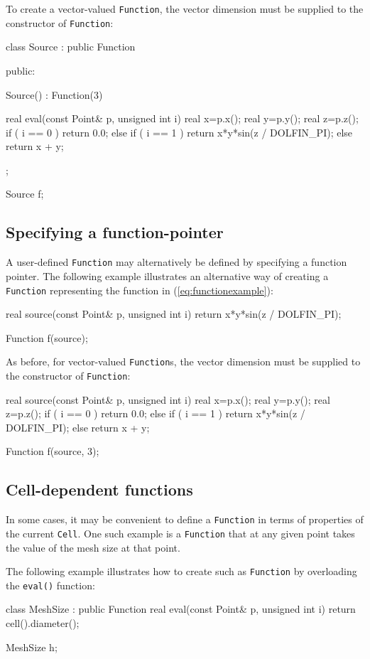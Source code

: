 To create a vector-valued \texttt{Function}, the vector dimension must
be supplied to the constructor of \texttt{Function}:
\begin{code}
class Source : public Function
{
public:

  Source() : Function(3) {}

  real eval(const Point& p, unsigned int i)
  {
    real x=p.x();
    real y=p.y();
    real z=p.z();
    if ( i == 0 )
      return 0.0;
    else if ( i == 1 )
      return x*y*sin(z / DOLFIN_PI);
    else
      return x + y;
  }
};

Source f;
\end{code}

\subsection{Specifying a function-pointer}

A user-defined \texttt{Function} may alternatively be defined by
specifying a function pointer. The following example illustrates
an alternative way of creating a \texttt{Function} representing the
function in (\ref{eq:functionexample}):
\begin{code}
real source(const Point& p, unsigned int i)
{
  return x*y*sin(z / DOLFIN_PI);
}

Function f(source);
\end{code}

As before, for vector-valued \texttt{Function}s, the vector dimension
must be supplied to the constructor of \texttt{Function}:
\begin{code}
real source(const Point& p, unsigned int i)
{
  real x=p.x();
  real y=p.y();
  real z=p.z();
  if ( i == 0 )
    return 0.0;
  else if ( i == 1 )
    return x*y*sin(z / DOLFIN_PI);
  else
    return x + y;
}

Function f(source, 3);
\end{code}

\subsection{Cell-dependent functions}

In some cases, it may be convenient to define a \texttt{Function} in
terms of properties of the current \texttt{Cell}. One such example is
a \texttt{Function} that at any given point takes the value of the
mesh size at that point.

The following example illustrates how to create such as
\texttt{Function} by overloading the \texttt{eval()} function:
\begin{code}
class MeshSize : public Function
{
  real eval(const Point& p, unsigned int i)
  {
    return cell().diameter();
  }
}

MeshSize h;
\end{code}

